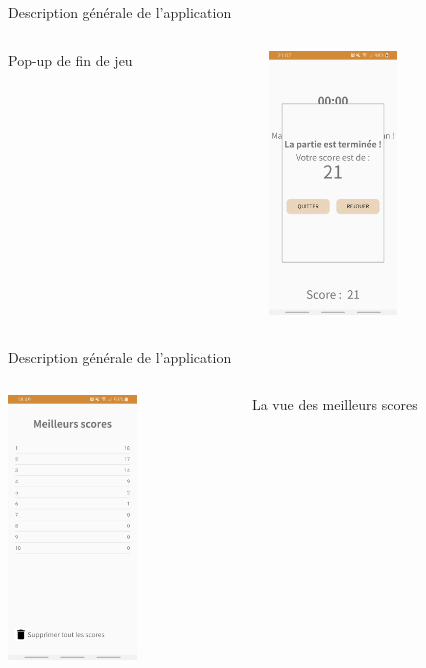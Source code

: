 \documentclass[xcolor=dvipsnames]{beamer}
\begin{document}
\begin{frame}{Description générale de l'application}
    \begin{columns}[T]
     \begin{column}[c]{5cm}
     \LARGE{Pop-up de fin de jeu}
     \end{column}
     \begin{column}[c]{5cm}
     \begin{center}\includegraphics[height=7cm]{Images/PopUpdefin.jpg}
     \end{center}
     \end{column}
     \end{columns}
\end{frame}

\begin{frame}{Description générale de l'application}
    \begin{columns}[T]
    \begin{column}[c]{5cm}
    \begin{center}\includegraphics[height=7cm]{Images/VueScores.jpg}
     \end{center}
    \end{column}
    \begin{column}[c]{5cm}
    \begin{center}
        \LARGE{La vue des meilleurs scores}
    \end{center}
    \end{column}
    \end{columns}
\end{frame}
\end{document}
